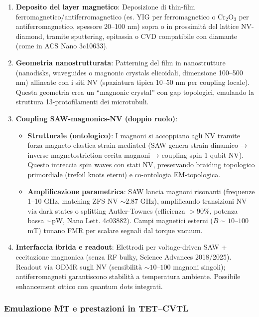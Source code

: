 \documentclass[12pt,a4paper]{article}
\begin{document}
\begin{enumerate}
    \item \textbf{Deposito del layer magnetico}: Deposizione di thin-film ferromagnetico/antiferromagnetico (es. YIG per ferromagnetico o Cr$_2$O$_3$ per antiferromagnetico, spessore 20--100 nm) sopra o in prossimità del lattice NV-diamond, tramite sputtering, epitassia o CVD compatibile con diamante (come in ACS Nano 3c10633).
    
    \item \textbf{Geometria nanostrutturata}: Patterning del film in nanostrutture (nanodisks, waveguides o magnonic crystals elicoidali, dimensione 100--500 nm) allineate con i siti NV (spaziatura tipica 10--50 nm per coupling locale). Questa geometria crea un ``magnonic crystal'' con gap topologici, emulando la struttura 13-protofilamenti dei microtubuli.
    
    \item \textbf{Coupling SAW-magnonics-NV (doppio ruolo)}:
    \begin{itemize}
        \item \textbf{Strutturale (ontologico)}: I magnoni si accoppiano agli NV tramite forza magneto-elastica strain-mediated (SAW genera strain dinamico → inverse magnetostriction eccita magnoni → coupling spin-1 qubit NV). Questo intreccia spin waves con stati NV, preservando braiding topologico primordiale (trefoil knots eterni) e co-ontologia EM-topologica.
        
        \item \textbf{Amplificazione parametrica}: SAW lancia magnoni risonanti (frequenze 1--10 GHz, matching ZFS NV $\sim 2.87$ GHz), amplificando transizioni NV via dark states o splitting Autler-Townes (efficienza $>$90\%, potenza bassa $\sim$pW, Nano Lett. 4c03882). Campi magnetici esterni ($B \sim 10$--$100$ mT) tunano FMR per scalare segnali dal torque vacuum.
    \end{itemize}
    
    \item \textbf{Interfaccia ibrida e readout}: Elettrodi per voltage-driven SAW + eccitazione magnonica (senza RF bulky, Science Advances 2018/2025). Readout via ODMR sugli NV (sensibilità $\sim 10$--$100$ magnoni singoli); antiferromagneti garantiscono stabilità a temperatura ambiente. Possibile enhancement ottico con quantum dots integrati.
\end{enumerate}

\subsubsection{Emulazione MT e prestazioni in TET--CVTL}
\end{document}
